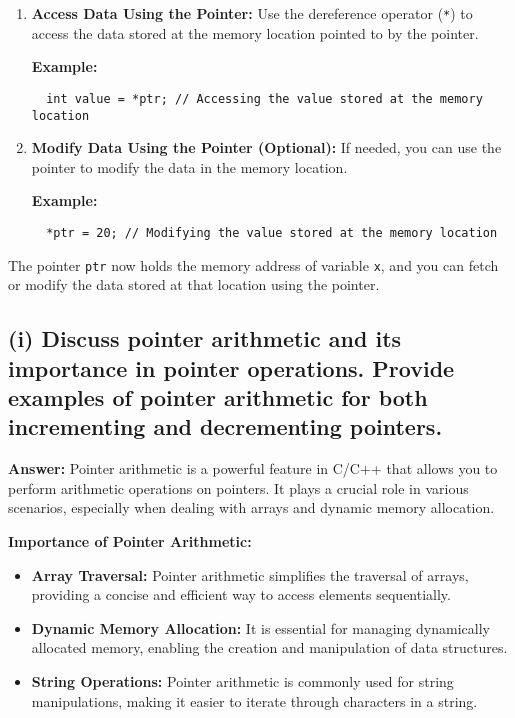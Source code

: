 \documentclass{article}
\begin{document}
\begin{enumerate}
\begin{enumerate}
  \item \textbf{Access Data Using the Pointer:} Use the dereference operator (\texttt{*}) to access the data stored at the memory location pointed to by the pointer.

  \textbf{Example:}
  \begin{verbatim}
  int value = *ptr; // Accessing the value stored at the memory location
  \end{verbatim}

  \item \textbf{Modify Data Using the Pointer (Optional):} If needed, you can use the pointer to modify the data in the memory location.

  \textbf{Example:}
  \begin{verbatim}
  *ptr = 20; // Modifying the value stored at the memory location
  \end{verbatim}
\end{enumerate}

The pointer \texttt{ptr} now holds the memory address of variable \texttt{x}, and you can fetch or modify the data stored at that location using the pointer.
\subsection*{(i) Discuss pointer arithmetic and its importance in pointer operations. Provide examples of pointer arithmetic for both incrementing and decrementing pointers.}

\textbf{Answer:} Pointer arithmetic is a powerful feature in C/C++ that allows you to perform arithmetic operations on pointers. It plays a crucial role in various scenarios, especially when dealing with arrays and dynamic memory allocation.

\textbf{Importance of Pointer Arithmetic:}
\begin{itemize}
    \item \textbf{Array Traversal:} Pointer arithmetic simplifies the traversal of arrays, providing a concise and efficient way to access elements sequentially.
    \item \textbf{Dynamic Memory Allocation:} It is essential for managing dynamically allocated memory, enabling the creation and manipulation of data structures.
    \item \textbf{String Operations:} Pointer arithmetic is commonly used for string manipulations, making it easier to iterate through characters in a string.
\end{itemize}


\end{enumerate}
\end{document}

